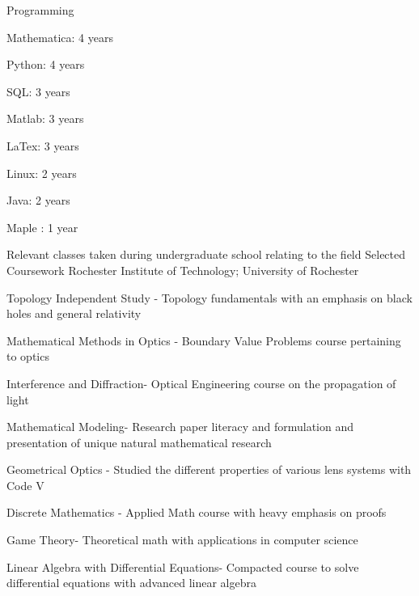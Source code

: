 \begin{cventries}
  \cventry
    {}
    {Programming}
    {}
    {}
    {
      \begin{cvitems}
        \item {Mathematica: 4 years }
        \item {Python: 4 years }
        \item {SQL: 3 years }
        \item {Matlab: 3 years }
        \item {LaTex: 3 years}
        \item {Linux: 2 years}
        \item {Java: 2 years}
        \item {Maple : 1 year}
      \end{cvitems}
    }

    \cventry
    {Relevant classes taken during undergraduate school relating to the field}
    {Selected Coursework}
    {Rochester Institute of Technology; University of Rochester}
    {}
    {
      \begin{cvitems}
        \item {Topology Independent Study - Topology fundamentals with an emphasis on black holes and general relativity}
        \item {Mathematical Methods in Optics - Boundary Value Problems course pertaining to optics}
        \item {Interference and Diffraction- Optical Engineering course on the propagation of light}
        \item {Mathematical Modeling- Research paper literacy and formulation and presentation of unique natural mathematical research}
        \item {Geometrical Optics - Studied the different properties of various lens systems with Code V}
        \item {Discrete Mathematics - Applied Math course with heavy emphasis on proofs}
        \item {Game Theory- Theoretical math with applications in computer science}
        \item {Linear Algebra with Differential Equations- Compacted course to solve differential equations with advanced linear algebra}
      \end{cvitems}
    }



\end{cventries}
